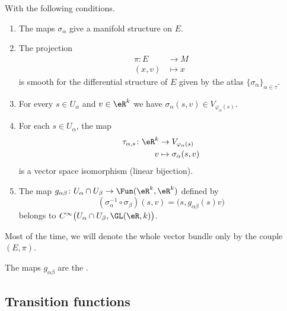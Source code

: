 \begin{definition}
	With the following conditions.
	\begin{enumerate}[label=(\alph*)]
		\item	\label{ITEMooVIYBooMXFaKb}
		      The maps \( \sigma_{\alpha}\) give a manifold structure on \( E\).
		\item	\label{ITEMooXHOBooERubro}
		      The projection
		      \begin{equation}
			      \begin{aligned}
				      \pi\colon E & \to M     \\
				      (x,v)       & \mapsto x
			      \end{aligned}
		      \end{equation}
		      is smooth for the differential structure of \( E\) given by the atlas \( \{ \sigma_{\alpha} \}_{\alpha\in\tau}\).
		\item		\label{ITEMooXJIVooVJTorK}
		      For every \( s\in U_{\alpha}\) and \( v\in \eR^k\) we have \( \sigma_{\alpha}(s,v)\in V_{\varphi_{\alpha}(s)}\).
		\item \label{ITEMooOBCMooOCqoQo}
		      For each \( s\in U_{\alpha}\), the map
		      \begin{equation}
			      \begin{aligned}
				      \tau_{\alpha,s}\colon \eR^k & \to V_{\varphi_{\alpha}(s)}  \\
				      v                           & \mapsto \sigma_{\alpha}(s,v)
			      \end{aligned}
		      \end{equation}
		      is a vector space isomorphism (linear bijection).
		\item		\label{ITEMooPNLXooLQWGqc}
		      The map \(g_{\alpha\beta} \colon U_{\alpha}\cap U_{\beta}\to \Fun(\eR^k,\eR^k)  \) defined by
		      \begin{equation}
			      (\sigma_{\alpha}^{-1}\circ \sigma_{\beta})(s,v)=\big( s,g_{\alpha\beta}(s)v \big)
		      \end{equation}
		      belongs to \( C^{\infty}\big( U_{\alpha}\cap U_{\beta},\GL(\eR,k) \big)\).
	\end{enumerate}
	Most of the time, we will denote the whole vector bundle only by the couple \( (E,\pi)\).

	The maps \( g_{\alpha\beta}\) are the .
\end{definition}

\subsection{Transition functions}

